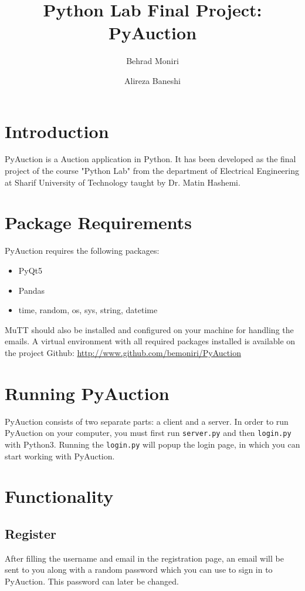 \documentclass{article}
\title {Python Lab Final Project: PyAuction}
\author{Behrad Moniri \and Alireza Baneshi}
\begin{document}
\maketitle
\section{Introduction}

PyAuction is a Auction application in Python. It has been developed as the final project of the course "Python Lab" from the department of Electrical Engineering at Sharif University of Technology taught by Dr. Matin Hashemi. 

\section{Package Requirements}
PyAuction requires the following packages:

\begin{itemize}
	\item PyQt5
	\item Pandas
	\item time, random, os, sys, string, datetime
\end{itemize}
MuTT should also be installed and configured on your machine for handling the emails. A virtual environment with all required packages installed is available on the project Github:
\url{http://www.github.com/bemoniri/PyAuction}

\section{Running PyAuction}

PyAuction consists of two separate parts: a client and a server. In order to run PyAuction on your computer, you must first run \texttt{server.py} and then \texttt{login.py} with Python3. Running the \texttt{login.py} will popup the login page, in which you can start working with PyAuction.

\section{Functionality}
\subsection{Register}
After filling the username and email in the registration page, an email will be sent to you along with a random password which you can use to sign in to PyAuction. This password can later be changed.
\end{document}
